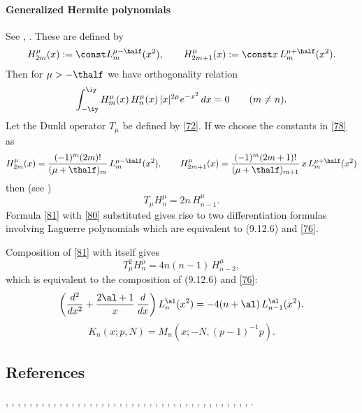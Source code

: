 \documentclass[envcountchap,graybox]{svmono}
\begin{document}
\paragraph{Generalized Hermite polynomials}
See , \cite[Section 1.5.1]{K26}.
These are defined by
\begin{equation}
H_{2m}^\mu(x):=\const L_m^{\mu-\half}(x^2),\qquad
H_{2m+1}^\mu(x):=\const x\,L_m^{\mu+\half}(x^2).
\label{78}
\end{equation}
Then for $\mu>-\thalf$ we have orthogonality relation
\begin{equation}
\int_{-\iy}^{\iy} H_m^\mu(x)\,H_n^\mu(x)\,|x|^{2\mu}e^{-x^2}\,dx
=0\qquad(m\ne n).
\label{79}
\end{equation}
Let the Dunkl operator $T_\mu$ be defined by \eqref{72}.
If we choose the constants in \eqref{78} as
\begin{equation}
H_{2m}^\mu(x)=\frac{(-1)^m(2m)!}{(\mu+\thalf)_m}\,L_m^{\mu-\half}(x^2),\qquad
H_{2m+1}^\mu(x)=\frac{(-1)^m(2m+1)!}{(\mu+\thalf)_{m+1}}\,
 x\,L_m^{\mu+\half}(x^2)
 \label{80}
\end{equation}
then (see \cite[(1.6)]{K5})
\begin{equation}
T_\mu H_n^\mu=2n\,H_{n-1}^\mu.
\label{81}
\end{equation}
Formula \eqref{81} with \eqref{80} substituted gives rise to two
differentiation formulas involving Laguerre polynomials which are equivalent to
(9.12.6) and \eqref{76}.

Composition of \eqref{81} with itself gives
\[
T_\mu^2 H_n^\mu=4n(n-1)\,H_{n-2}^\mu,
\]
which is equivalent to the composition of (9.12.6) and \eqref{76}:
\begin{equation}
\left(\frac{d^2}{dx^2}+\frac{2\al+1}x\,\frac d{dx}\right)L_n^\al(x^2)
=-4(n+\al)\,L_{n-1}^\al(x^2).
\label{82}
\end{equation}
$$K_n(x;p,N)=M_n(x;-N,(p-1)^{-1}p).$$

\subsection*{References}
\cite{AlSalam90}, \cite{AndrewsAskey85}, \cite{Area+II}, \cite{Askey75}, \cite{Askey89I},
\cite{AskeyGasper77}, \cite{AskeyWilson85}, \cite{AtakRahmanSuslov}, \cite{Campigotto+},
\cite{LChiharaStanton}, \cite{Chihara78}, \cite{Dette95}, \cite{Dominici}, \cite{Dunkl76},
\cite{Dunkl84}, \cite{DunklRamirez}, \cite{Erdelyi+}, \cite{FeinsilverSchott},
\cite{Gasper73I}, \cite{Gasper74}, \cite{HoareRahman}, \cite{Ismail2005II}, \cite{Karlin58},
\cite{Koorn82}, \cite{Koorn88}, \cite{LabelleYehI}, \cite{LabelleYehII}, \cite{Lesky62},
\cite{Lesky89}, \cite{Lesky94I}, \cite{Lesky95II}, \cite{LewanowiczII}, \cite{Nikiforov+},
\cite{NikiforovUvarov}, \cite{Qiu}, \cite{Rahman78I}, \cite{Rahman79}, \cite{Stanton84},
\cite{Stanton90}, \cite{Szego75}, \cite{Zarzo+}, \cite{Zeng90}.
\end{document}
